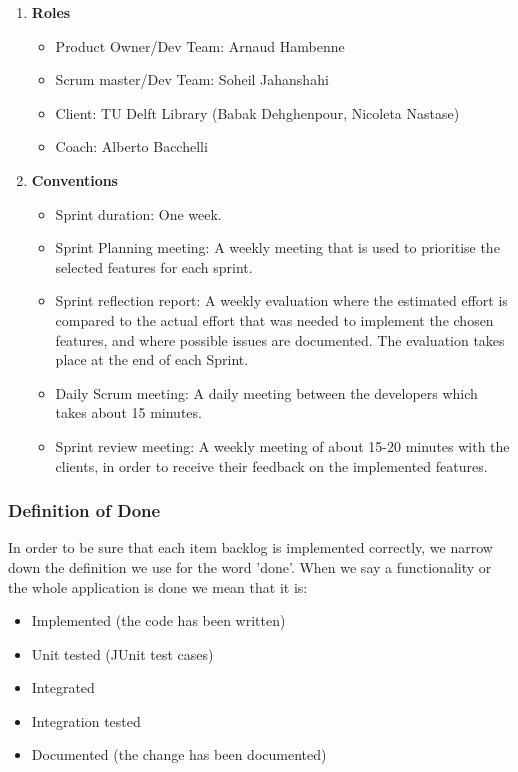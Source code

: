 \begin{enumerate}
	\item \textbf{Roles}
		\begin{itemize}
			\item Product Owner/Dev Team: Arnaud Hambenne
			\item Scrum master/Dev Team: Soheil Jahanshahi
			\item Client: TU Delft Library (Babak Dehghenpour, Nicoleta Nastase)
			\item Coach: Alberto Bacchelli
		\end{itemize}
	\item \textbf{Conventions}	
\begin{itemize}
		\item Sprint duration: One week.
		\item Sprint Planning meeting: A weekly meeting that is used to prioritise the selected features for each sprint. 
		\item Sprint reflection report: A weekly evaluation where the estimated effort is compared to the actual effort that was needed to implement the chosen features, and where possible issues are documented. The evaluation takes place at the end of each Sprint.
		\item Daily Scrum meeting: A daily meeting between the developers which takes about 15 minutes.
		\item Sprint review meeting: A weekly meeting of about 15-20 minutes with the clients, in order to receive their feedback on the implemented features.
\end{itemize}
\end{enumerate}

\subsubsection{Definition of Done} 
In order to be sure that each item backlog is implemented correctly, we narrow down the definition we use for the word 'done'. When we say a functionality or the whole application is done we mean that it is: 

\begin{itemize}
	\item	Implemented (the code has been written)
	\item	Unit tested (JUnit test cases)
	\item 	Integrated
	\item 	Integration tested
	\item 	Documented (the change has been documented)
\end{itemize} 

